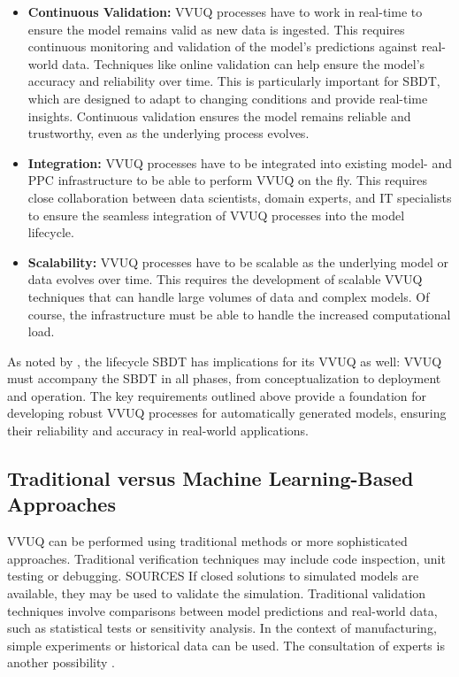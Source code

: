 \begin{itemize}
  \item \textbf{Continuous Validation:} VVUQ processes have to work in real-time to ensure the model remains valid as new data is ingested. This requires continuous monitoring and validation of the model's predictions against real-world data. Techniques like online validation \autocite{francis2021towards} can help ensure the model's accuracy and reliability over time. This is particularly important for SBDT, which are designed to adapt to changing conditions and provide real-time insights. Continuous validation ensures the model remains reliable and trustworthy, even as the underlying process evolves.
  \item \textbf{Integration:} VVUQ processes have to be integrated into existing model- and PPC infrastructure to be able to perform VVUQ on the fly. This requires close collaboration between data scientists, domain experts, and IT specialists to ensure the seamless integration of VVUQ processes into the model lifecycle.
  \item \textbf{Scalability:} VVUQ processes have to be scalable as the underlying model or data evolves over time. This requires the development of scalable VVUQ techniques that can handle large volumes of data and complex models. Of course, the infrastructure must be able to handle the increased computational load.
\end{itemize}

As noted by \citeauthor{francis2021towards}, the lifecycle SBDT has implications for its VVUQ as well: VVUQ must accompany the SBDT in all phases, from conceptualization to deployment and operation. The key requirements outlined above provide a foundation for developing robust VVUQ processes for automatically generated models, ensuring their reliability and accuracy in real-world applications.

\subsection{Traditional versus Machine Learning-Based Approaches}
\label{sec:ml-approaches}

VVUQ can be performed using traditional methods or more sophisticated approaches. Traditional verification techniques may include code inspection, unit testing or debugging. SOURCES If closed solutions to simulated models are available, they may be used to validate the simulation. Traditional validation techniques involve comparisons between model predictions and real-world data, such as statistical tests or sensitivity analysis. In the context of manufacturing, simple experiments or historical data can be used. The consultation of experts is another possibility \parencite{shao2023credibility}.

